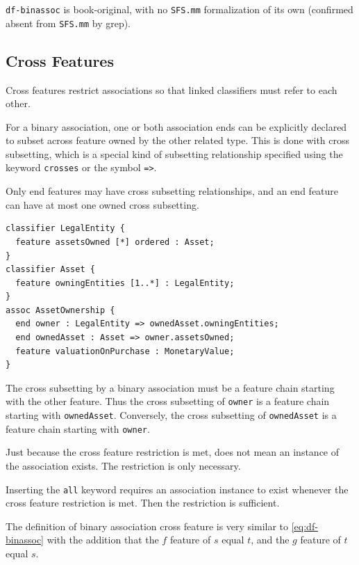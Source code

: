 \pn \texttt{df-binassoc} is book-original, with no \texttt{SFS.mm} formalization of its own (confirmed absent
from \texttt{SFS.mm} by grep).


\subsection{Cross Features}

\pn Cross features restrict associations so that linked classifiers must refer to each other.

\pn For a binary association, one or both association ends can be explicitly declared to subset across feature owned by
the other related type. 
This is done with cross subsetting, which is a special kind of subsetting relationship specified
using the keyword \texttt{crosses} or the symbol \texttt{=>}. 

\pn Only end features may have cross subsetting relationships, and an
end feature can have at most one owned cross subsetting.

\begin{lstlisting}
classifier LegalEntity {
  feature assetsOwned [*] ordered : Asset;
}
classifier Asset {
  feature owningEntities [1..*] : LegalEntity;
}
assoc AssetOwnership {
  end owner : LegalEntity => ownedAsset.owningEntities;
  end ownedAsset : Asset => owner.assetsOwned;
  feature valuationOnPurchase : MonetaryValue;
}
\end{lstlisting}

\pn The cross subsetting by a binary association must be a feature chain starting with the other feature.
Thus the cross subsetting of \texttt{owner} is a feature chain starting with \texttt{ownedAsset}.
Conversely, the cross subsetting of \texttt{ownedAsset} is a feature chain starting with \texttt{owner}.

\pn Just because the cross feature restriction is met, does not mean an instance of the association exists.  The restriction is only necessary.

\pn Inserting the \texttt{all} keyword requires an association instance to exist whenever the cross feature restriction is met.  Then the restriction is sufficient.

\pn The definition of binary association cross feature is very similar to \ref{eq:df-binassoc} with the addition that the $f$ feature of $s$ equal $t$,
and the $g$ feature of $t$ equal $s$.

